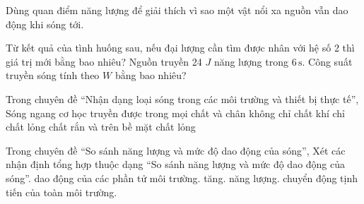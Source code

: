 \begin{ex}
Dùng quan điểm năng lượng để giải thích vì sao một vật nổi xa nguồn vẫn dao động khi sóng tới.
\choiceTF

\end{ex}

\begin{ex}
Từ kết quả của tình huống sau, nếu đại lượng cần tìm được nhân với hệ số 2 thì giá trị mới bằng bao nhiêu? Nguồn truyền 24 $J$ năng lượng trong $6\,\text{s}$. Công suất truyền sóng tính theo $W$ bằng bao nhiêu?
\end{ex}

\begin{ex}
Trong chuyên đề “Nhận dạng loại sóng trong các môi trường và thiết bị thực tế”, Sóng ngang cơ học truyền được trong
\choice
{mọi chất và chân không}
{chỉ chất khí}
{chỉ chất lỏng}
{\True chất rắn và trên bề mặt chất lỏng}
\end{ex}

\begin{ex}
Trong chuyên đề “So sánh năng lượng và mức độ dao động của sóng”, Xét các nhận định tổng hợp thuộc dạng “So sánh năng lượng và mức độ dao động của sóng”.
\choiceTF
{\True dao động của các phần tử môi trường.}
{\True tăng.}
{\True năng lượng.}
{chuyển động tịnh tiến của toàn môi trường.}
\end{ex}

